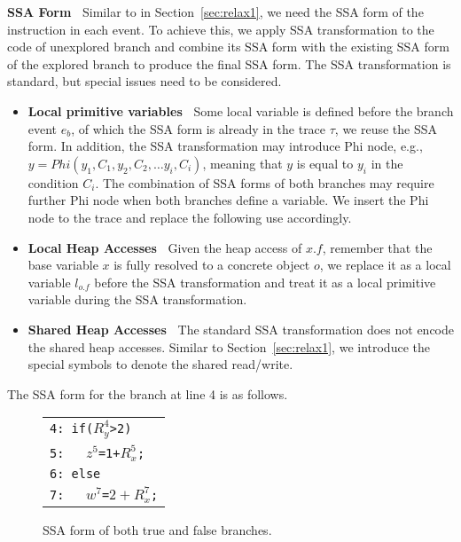 {\bf SSA Form\ }  Similar to in Section~\ref{sec:relax1}, we need the SSA form of the instruction in each event. To achieve this, we apply SSA transformation to the code of  unexplored branch and combine its SSA form with the existing SSA form of the explored branch to produce the final SSA form. The SSA transformation is standard, but special issues need to be considered.
\begin{itemize}
\item {\bf Local primitive variables\ }  Some local variable is defined before the branch event $e_b$, of which the SSA form is already in the trace $\tau$, we reuse the SSA form.  In addition, the SSA transformation may introduce Phi node, e.g., $y=Phi(y_1, C_1, y_2, C_2, \dots y_i, C_i)$, meaning that $y$ is equal to $y_i$ in the condition $C_i$. The combination of SSA forms of both branches may require further Phi node when both branches define a variable. We insert the Phi node to the trace and replace the following use accordingly.
\item {\bf Local Heap Accesses\ } Given the heap access of $x.f$, remember that the base variable $x$ is fully resolved to a concrete object $o$, we replace it as a local variable $l_{o.f}$ before the SSA transformation and treat it as a local primitive variable during the SSA transformation. 
\item {\bf Shared Heap Accesses\ } The standard SSA transformation does not encode the shared heap accesses. Similar to Section~\ref{sec:relax1}, we introduce the special symbols to denote the shared read/write.
\end{itemize}

The SSA form for the branch at line 4 is as follows. 



\begin{figure}
\centering
\begin{tabular}{l}
 {\tt 4: if($R^4_y$>2)}  \\ %
{\tt 5: \ \ $z^5$=1+$R^5_x$;}   \\%
 {{\tt 6:  else}}   \\ %
 {{\tt 7: \ \ $w^7$=$2+R^{7}_{x}$;}}  \\ %
\end{tabular}
\caption{SSA form of both true and false branches. }
\label{fig:pathssa}
\end{figure}






